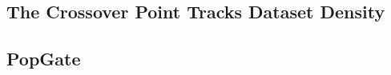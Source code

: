 \documentclass[runningheads]{llncs}
\begin{document}
\subsection{The Crossover Point Tracks Dataset Density}
\label{sec:results-density}


\subsection{PopGate}
\label{sec:results-popgate}




























\end{document}
